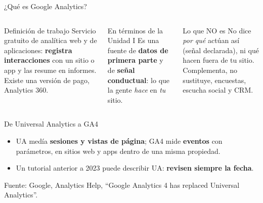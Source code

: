 \documentclass[aspectratio=169,xcolor=dvipsnames]{beamer}
\newcommand{\fuente}[1]{{\tiny\color{IPNgris}Fuente: #1}}
\begin{document}
\begin{frame}{¿Qué es Google Analytics?}
\begin{columns}[T]
  \begin{block}{Definición de trabajo}
    \small Servicio gratuito de analítica web y de aplicaciones: \textbf{registra interacciones} con un sitio o app y las resume en informes. Existe una versión de pago, Analytics 360.
  \end{block}
  \begin{exampleblock}{En términos de la Unidad I}
    \small Es una fuente de \textbf{datos de primera parte} y de \textbf{señal conductual}: lo que la gente \emph{hace} en \emph{tu} sitio.
  \end{exampleblock}
  \begin{alertblock}{Lo que NO es}
    \small No dice \emph{por qué} actúan así (señal declarada), ni qué hacen fuera de tu sitio. Complementa, no sustituye, encuestas, escucha social y CRM.
  \end{alertblock}
\end{columns}
\end{frame}

\begin{frame}{De Universal Analytics a GA4}
\begin{center}
\end{center}
\vspace{4pt}
\begin{itemize}
  \small
  \item UA medía \textbf{sesiones y vistas de página}; GA4 mide \textbf{eventos} con parámetros, en sitios web y apps dentro de una misma propiedad.
  \item Un tutorial anterior a 2023 puede describir UA: \textbf{revisen siempre la fecha}.
\end{itemize}
\fuente{Google, Analytics Help, \enquote{Google Analytics 4 has replaced Universal Analytics}.}
\end{frame}
\end{document}
